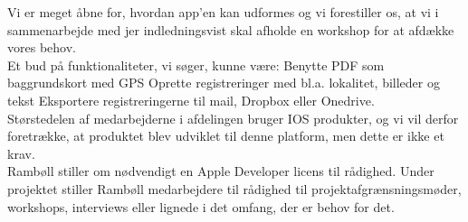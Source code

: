 Vi er meget åbne for, hvordan app’en kan udformes og vi forestiller os, at vi i sammenarbejde med jer indledningsvist skal afholde en workshop for at afdække vores behov.\\
Et bud på funktionaliteter, vi søger, kunne være:
Benytte PDF som baggrundskort med GPS
Oprette registreringer med bl.a. lokalitet, billeder og tekst
Eksportere registreringerne til mail, Dropbox eller Onedrive.\\
Størstedelen af medarbejderne i afdelingen bruger IOS produkter, og vi vil derfor foretrække, at produktet blev
udviklet til denne platform, men dette er ikke et krav. \\
Rambøll stiller om nødvendigt en Apple Developer licens til rådighed.
Under projektet stiller Rambøll medarbejdere til rådighed til projektafgrænsningsmøder, workshops, interviews
eller lignede i det omfang, der er behov for det. 